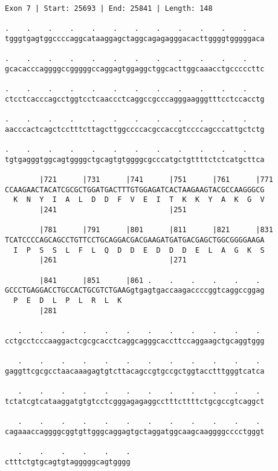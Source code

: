 \documentclass{article}
\begin{document}
\begin{Verbatim}
Exon 7 | Start: 25693 | End: 25841 | Length: 148
 
.    .    .    .    .    .    .    .    .    .    .    .    
tgggtgagtggccccaggcataaggagctaggcagagagggacacttggggtgggggaca
  
.    .    .    .    .    .    .    .    .    .    .    .    
gcacacccaggggccgggggccaggagtggaggctggcacttggcaaacctgcccccttc
  
.    .    .    .    .    .    .    .    .    .    .    .    
ctcctcacccagcctggtcctcaaccctcaggccgcccagggaagggtttcctccacctg
  
.    .    .    .    .    .    .    .    .    .    .    .    
aacccactcagctcctttcttagcttggccccacgccaccgtccccagcccattgctctg
  
.    .    .    .    .    .    .    .    .    .    .    .    
tgtgagggtggcagtggggctgcagtgtggggcgcccatgctgttttctctcatgcttca
  
        |721      |731      |741      |751      |761      |771
CCAAGAACTACATCGCGCTGGATGACTTTGTGGAGATCACTAAGAAGTACGCCAAGGGCG
  K  N  Y  I  A  L  D  D  F  V  E  I  T  K  K  Y  A  K  G  V
        |241                          |251                  
  
        |781      |791      |801      |811      |821      |831
TCATCCCCAGCAGCCTGTTCCTGCAGGACGACGAAGATGATGACGAGCTGGCGGGGAAGA
  I  P  S  S  L  F  L  Q  D  D  E  D  D  D  E  L  A  G  K  S
        |261                          |271                  
  
        |841      |851      |861 .    .    .    .    .    . 
GCCCTGAGGACCTGCCACTGCGTCTGAAGgtgagtgaccaagaccccggtcaggccggag
  P  E  D  L  P  L  R  L  K                                 
        |281                                                
  
   .    .    .    .    .    .    .    .    .    .    .    . 
cctgcctcccaaggactcgcgcacctcaggcagggcaccttccaggaagctgcaggtggg
  
   .    .    .    .    .    .    .    .    .    .    .    . 
gaggttcgcgcctaacaaagagtgtcttacagccgtgccgctggtacctttgggtcatca
  
   .    .    .    .    .    .    .    .    .    .    .    . 
tctatcgtcataaggatgtgtcctcgggagagaggcctttcttttctgcgccgtcaggct
  
   .    .    .    .    .    .    .    .    .    .    .    . 
cagaaaccaggggcggtgttgggcaggagtgctaggatggcaagcaaggggcccctgggt
  
   .    .    .    .    .    .
ctttctgtgcagtgtagggggcagtgggg
\end{Verbatim}
\end{document}
